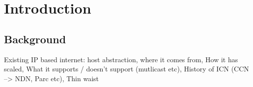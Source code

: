 \chapter{Introduction}
\cite{einstein}
\section{Background}
Existing IP based internet: host abstraction, where it comes from, How it has scaled, What it supports / doesn't support (mutlicast etc), History of ICN (CCN --> NDN, Parc etc), Thin waist